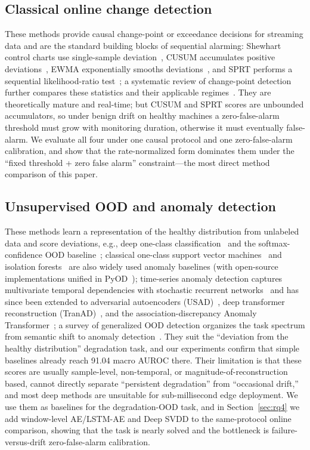 \documentclass[journal]{IEEEtran}
\begin{document}
\subsection{Classical online change detection}
These methods provide causal change-point or exceedance decisions for streaming data and are the standard building blocks of sequential alarming: Shewhart control charts use single-sample deviation~\cite{shewhart1931}, CUSUM accumulates positive deviations~\cite{page1954}, EWMA exponentially smooths deviations~\cite{roberts1959}, and SPRT performs a sequential likelihood-ratio test~\cite{wald1945}; a systematic review of change-point detection further compares these statistics and their applicable regimes~\cite{truong2020}. They are theoretically mature and real-time; but CUSUM and SPRT scores are unbounded accumulators, so under benign drift on healthy machines a zero-false-alarm threshold must grow with monitoring duration, otherwise it must eventually false-alarm. We evaluate all four under one causal protocol and one zero-false-alarm calibration, and show that the rate-normalized form dominates them under the ``fixed threshold + zero false alarm'' constraint---the most direct method comparison of this paper.

\subsection{Unsupervised OOD and anomaly detection}
These methods learn a representation of the healthy distribution from unlabeled data and score deviations, e.g., deep one-class classification~\cite{ruff2018} and the softmax-confidence OOD baseline~\cite{hendrycks2017}; classical one-class support vector machines~\cite{scholkopf2001} and isolation forests~\cite{liu2008} are also widely used anomaly baselines (with open-source implementations unified in PyOD~\cite{zhao2019pyod}); time-series anomaly detection captures multivariate temporal dependencies with stochastic recurrent networks~\cite{su2019} and has since been extended to adversarial autoencoders (USAD)~\cite{audibert2020usad}, deep transformer reconstruction (TranAD)~\cite{tuli2022tranad}, and the association-discrepancy Anomaly Transformer~\cite{xu2022anomaly}; a survey of generalized OOD detection organizes the task spectrum from semantic shift to anomaly detection~\cite{yang2024}. They suit the ``deviation from the healthy distribution'' degradation task, and our experiments confirm that simple baselines already reach 91.04 macro AUROC there. Their limitation is that these scores are usually sample-level, non-temporal, or magnitude-of-reconstruction based, cannot directly separate ``persistent degradation'' from ``occasional drift,'' and most deep methods are unsuitable for sub-millisecond edge deployment. We use them as baselines for the degradation-OOD task, and in Section~\ref{sec:rq4} we add window-level AE/LSTM-AE and Deep SVDD to the same-protocol online comparison, showing that the task is nearly solved and the bottleneck is failure-versus-drift zero-false-alarm calibration.
\end{document}
